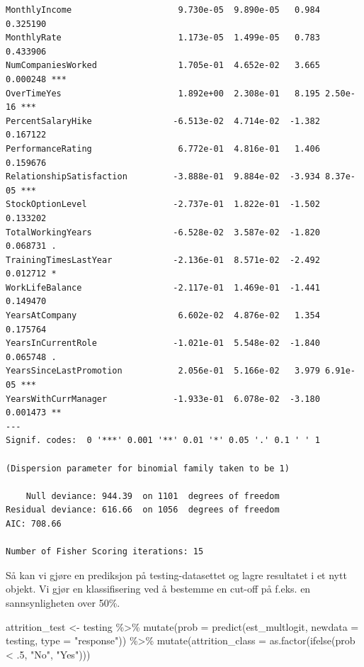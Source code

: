 \documentclass[
  letterpaper,
  DIV=11,
  numbers=noendperiod]{scrreprt}
\newenvironment{Shaded}{\begin{snugshade}}{\end{snugshade}}
\newcommand{\AttributeTok}[1]{\textcolor[rgb]{0.40,0.45,0.13}{#1}}
\newcommand{\DecValTok}[1]{\textcolor[rgb]{0.68,0.00,0.00}{#1}}
\newcommand{\FunctionTok}[1]{\textcolor[rgb]{0.28,0.35,0.67}{#1}}
\newcommand{\NormalTok}[1]{\textcolor[rgb]{0.00,0.23,0.31}{#1}}
\newcommand{\OtherTok}[1]{\textcolor[rgb]{0.00,0.23,0.31}{#1}}
\newcommand{\SpecialCharTok}[1]{\textcolor[rgb]{0.37,0.37,0.37}{#1}}
\newcommand{\StringTok}[1]{\textcolor[rgb]{0.13,0.47,0.30}{#1}}
\begin{document}
\begin{verbatim}
MonthlyIncome                     9.730e-05  9.890e-05   0.984 0.325190    
MonthlyRate                       1.173e-05  1.499e-05   0.783 0.433906    
NumCompaniesWorked                1.705e-01  4.652e-02   3.665 0.000248 ***
OverTimeYes                       1.892e+00  2.308e-01   8.195 2.50e-16 ***
PercentSalaryHike                -6.513e-02  4.714e-02  -1.382 0.167122    
PerformanceRating                 6.772e-01  4.816e-01   1.406 0.159676    
RelationshipSatisfaction         -3.888e-01  9.884e-02  -3.934 8.37e-05 ***
StockOptionLevel                 -2.737e-01  1.822e-01  -1.502 0.133202    
TotalWorkingYears                -6.528e-02  3.587e-02  -1.820 0.068731 .  
TrainingTimesLastYear            -2.136e-01  8.571e-02  -2.492 0.012712 *  
WorkLifeBalance                  -2.117e-01  1.469e-01  -1.441 0.149470    
YearsAtCompany                    6.602e-02  4.876e-02   1.354 0.175764    
YearsInCurrentRole               -1.021e-01  5.548e-02  -1.840 0.065748 .  
YearsSinceLastPromotion           2.056e-01  5.166e-02   3.979 6.91e-05 ***
YearsWithCurrManager             -1.933e-01  6.078e-02  -3.180 0.001473 ** 
---
Signif. codes:  0 '***' 0.001 '**' 0.01 '*' 0.05 '.' 0.1 ' ' 1

(Dispersion parameter for binomial family taken to be 1)

    Null deviance: 944.39  on 1101  degrees of freedom
Residual deviance: 616.66  on 1056  degrees of freedom
AIC: 708.66

Number of Fisher Scoring iterations: 15
\end{verbatim}

Så kan vi gjøre en prediksjon på testing-datasettet og lagre resultatet
i et nytt objekt. Vi gjør en klassifisering ved å bestemme en cut-off på
f.eks. en sannsynligheten over 50\%.

\begin{Shaded}
\begin{Highlighting}[]
\NormalTok{attrition\_test }\OtherTok{\textless{}{-}}\NormalTok{ testing }\SpecialCharTok{\%\textgreater{}\%} 
  \FunctionTok{mutate}\NormalTok{(}\AttributeTok{prob =} \FunctionTok{predict}\NormalTok{(est\_multlogit, }\AttributeTok{newdata =}\NormalTok{ testing, }\AttributeTok{type =} \StringTok{"response"}\NormalTok{)) }\SpecialCharTok{\%\textgreater{}\%} 
    \FunctionTok{mutate}\NormalTok{(}\AttributeTok{attrition\_class =} \FunctionTok{as.factor}\NormalTok{(}\FunctionTok{ifelse}\NormalTok{(prob }\SpecialCharTok{\textless{}}\NormalTok{ .}\DecValTok{5}\NormalTok{, }\StringTok{"No"}\NormalTok{, }\StringTok{"Yes"}\NormalTok{)))}
\end{Highlighting}
\end{Shaded}
\end{document}
